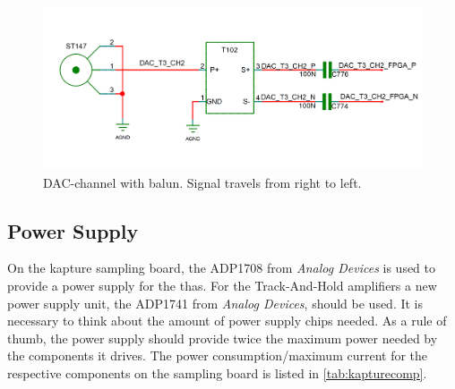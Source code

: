 \begin{figure}[tbh]
	\centering
	\includegraphics[width = \textwidth]{chap/04-work/img/dac_channel}
	\caption{DAC-channel with balun. Signal travels from right to left.}
	\label{fig:dac_channel}
\end{figure}


\subsection{Power Supply}
On the \gls{kapture} sampling board, the ADP1708 from \textit{Analog Devices} is used to provide a power supply for the \glspl{tha}. 
For the Track-And-Hold amplifiers a new power supply unit, the ADP1741 from \textit{Analog Devices}, should be used. It is necessary to think about the amount of power supply chips needed.
As a rule of thumb, the power supply should provide twice the maximum power needed by the components it drives. \cite{michele}
The power consumption/maximum current for the respective components on the sampling board is listed in \autoref{tab:kapturecomp}. 

